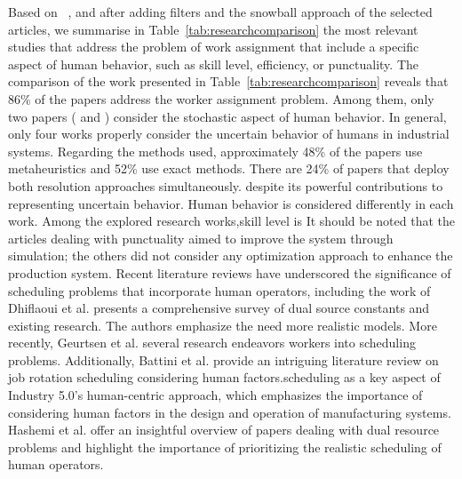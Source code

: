 \documentclass[review,12pt, 3p, times]{elsarticle}
\begin{document}
Based on ~\cite{Katiraee2021a}, and after adding filters and the snowball approach of the selected articles, we summarise in Table~\ref{tab:researchcomparison} the most relevant studies that address the problem of work assignment that include a specific aspect of human behavior, such as skill level, efficiency, or punctuality. The comparison of the work presented in Table~\ref{tab:researchcomparison} reveals that 86\% of the  papers address the worker assignment problem. Among them, only two papers (\cite{ayough2023robust} and \cite{Bouaziz2022}) consider the stochastic aspect of human behavior. In general, only four works properly consider the uncertain behavior of humans in industrial systems. 
Regarding the methods used, approximately 48\% of the papers use metaheuristics and 52\% use exact methods. There are 24\% of papers that deploy both resolution approaches simultaneously.
 despite its powerful contributions to representing uncertain behavior. Human behavior is considered differently in each work. Among the explored research works,skill level is  
It should be noted that  the articles dealing with punctuality aimed to improve the system through simulation; the others did not consider any optimization approach to enhance the production system. 
Recent literature reviews have underscored the significance of scheduling problems that incorporate human operators, including the work of Dhiflaoui et al. \cite{dhiflaoui2018dual}  presents a comprehensive survey of dual source constants and   existing research. The authors emphasize the need   more realistic models. More recently, Geurtsen et al. \cite{geurtsen2023production}  several research endeavors  workers into scheduling problems. Additionally, Battini et al. \cite{battini2022towards} provide an intriguing literature review on job rotation scheduling considering human factors.scheduling as a key aspect of  Industry 5.0's human-centric approach, which emphasizes the importance of considering human factors in the design and operation of manufacturing systems. Hashemi et al. \cite{hashemi2020operations} offer an insightful overview of papers dealing with dual resource problems and highlight the importance of prioritizing the realistic scheduling of human operators.
	
\end{document}
